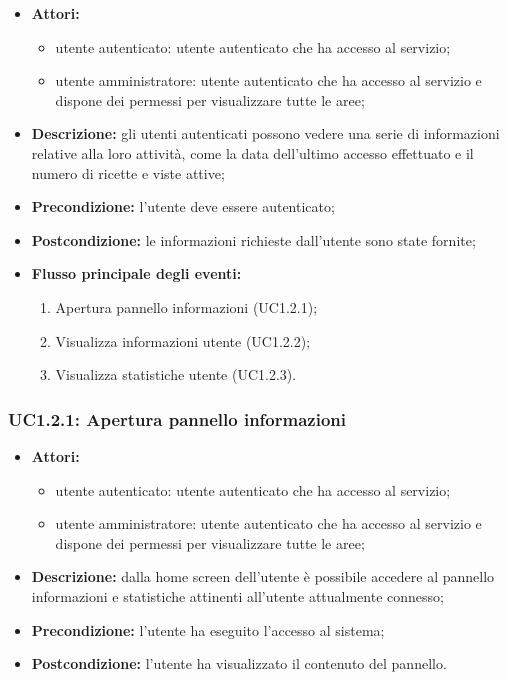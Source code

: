 \begin{itemize}
    \item \textbf{Attori:}
    \begin{itemize}
        \item utente autenticato: utente autenticato che ha accesso al servizio;
        \item utente amministratore: utente autenticato che ha accesso al servizio e dispone dei permessi per visualizzare tutte le aree;
    \end{itemize}
    \item \textbf{Descrizione:} gli utenti autenticati possono vedere una serie di informazioni relative alla 	loro attività, come la data dell'ultimo accesso effettuato e il numero di ricette e viste attive;
    \item \textbf{Precondizione:} l'utente deve essere autenticato;
    \item \textbf{Postcondizione:} le informazioni richieste dall'utente sono state fornite;
    \item \textbf{Flusso principale degli eventi:}
    \begin{enumerate}
        \item Apertura pannello informazioni (UC1.2.1);
        \item Visualizza informazioni utente (UC1.2.2);
        \item Visualizza statistiche utente (UC1.2.3).
    \end{enumerate}
\end{itemize}

\subsubsection{UC1.2.1: Apertura pannello informazioni}

\begin{itemize}
    \item \textbf{Attori:}
    \begin{itemize}
        \item utente autenticato: utente autenticato che ha accesso al servizio;
        \item utente amministratore: utente autenticato che ha accesso al servizio e dispone dei permessi per visualizzare tutte le aree;
    \end{itemize}
    \item \textbf{Descrizione:} dalla home screen dell'utente è possibile accedere al pannello informazioni e statistiche attinenti all'utente attualmente connesso;
    \item \textbf{Precondizione:} l'utente ha eseguito l'accesso al sistema;
    \item \textbf{Postcondizione:} l'utente ha visualizzato il contenuto del pannello.
\end{itemize}

